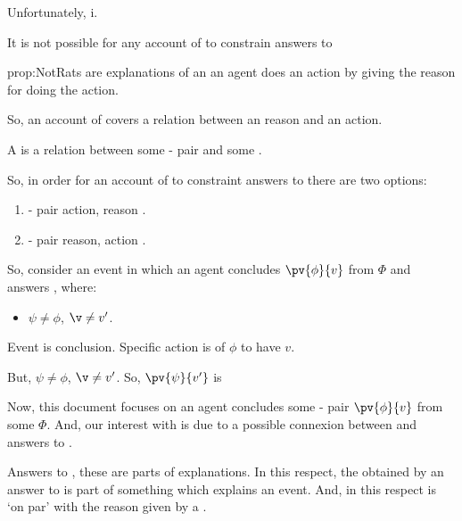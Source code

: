 \begin{note}
  Unfortunately, i.

  \begin{proposition}
    \label{prop:NotRats}
    It is not possible for any account of  to constrain answers to \qWhy{}
  \end{proposition}

  \begin{argument}{prop:NotRats}
     are explanations of an \eiw{} an agent does an action by giving the \agents{} reason for doing the action.

    So, an account of  covers a relation between an \agents{} reason and an action.

    A \fingfr{} is a relation between some - pair and some \pool{}.

    So, in order for an account of  to constraint answers to \qWhy{} there are two options:

    \begin{enumerate}
    \item
      - pair action, \agents{} reason \pool{}.
    \item
      - pair \agents{} reason, action \pool{}.
    \end{enumerate}

    So, consider an event in which an agent concludes \(\pv{\phi}{v}\) from \(\Phi\) and  answers \qWhy{}, where:
    \begin{itemize}
    \item
      \(\psi \ne \phi\), \(\v \ne v'\).
    \end{itemize}

    Event is conclusion.
    Specific action is \evalion{} of \(\phi\) to have \val{} \(v\).

    But, \(\psi \ne \phi\), \(\v \ne v'\).
    So, \(\pv{\psi}{v'}\) is 
  \end{argument}





  
  Now, this document focuses on \eiw{} an agent concludes some - pair \(\pv{\phi}{v}\) from some \pool{} \(\Phi\).
  And, our interest with  is due to a possible connexion between \rationalisation{} and answers to \qWhy{}.

  Answers to \qWhy{}, these are parts of explanations.
  In this respect, the \fingfr{} obtained by an answer to \qWhy{} is part of something which explains an event.
  And, in this respect is `on par' with the \agents{} reason given by a .



\end{note}
